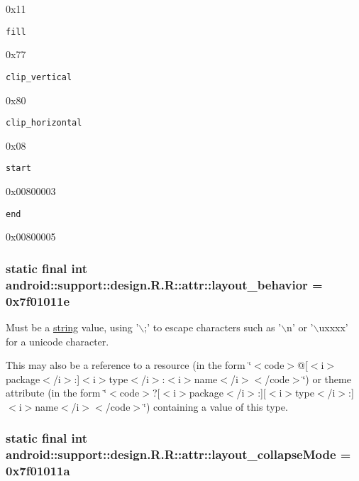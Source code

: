 0x11

{\tt fill}

0x77

{\tt clip\_\-vertical}

0x80

{\tt clip\_\-horizontal}

0x08

{\tt start}

0x00800003

{\tt end}

0x00800005\hypertarget{classandroid_1_1support_1_1design_1_1_r_1_1attr_6198867c291d91b0931bea26a6e0f87a}{
\subsubsection[{layout\_\-behavior}]{\setlength{\rightskip}{0pt plus 5cm}static final int android::support::design.R.R::attr::layout\_\-behavior = 0x7f01011e}}
\label{classandroid_1_1support_1_1design_1_1_r_1_1attr_6198867c291d91b0931bea26a6e0f87a}


Must be a \hyperlink{classandroid_1_1support_1_1design_1_1_r_1_1string}{string} value, using '$\backslash$;' to escape characters such as '$\backslash$n' or '$\backslash$uxxxx' for a unicode character. 

This may also be a reference to a resource (in the form \char`\"{}$<$code$>$@\mbox{[}$<$i$>$package$<$/i$>$:\mbox{]}$<$i$>$type$<$/i$>$:$<$i$>$name$<$/i$>$$<$/code$>$\char`\"{}) or theme attribute (in the form \char`\"{}$<$code$>$?\mbox{[}$<$i$>$package$<$/i$>$:\mbox{]}\mbox{[}$<$i$>$type$<$/i$>$:\mbox{]}$<$i$>$name$<$/i$>$$<$/code$>$\char`\"{}) containing a value of this type. \hypertarget{classandroid_1_1support_1_1design_1_1_r_1_1attr_70509ee3d2ba75ea64a5f12b2dd884b0}{
\subsubsection[{layout\_\-collapseMode}]{\setlength{\rightskip}{0pt plus 5cm}static final int android::support::design.R.R::attr::layout\_\-collapseMode = 0x7f01011a}}
\label{classandroid_1_1support_1_1design_1_1_r_1_1attr_70509ee3d2ba75ea64a5f12b2dd884b0}


